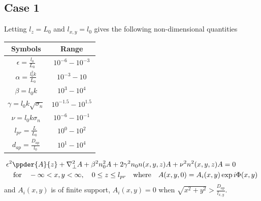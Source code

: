 \subsection{Case 1}
Letting $l_{z} = L_0$ and $l_{x,y} = l_0$ gives the following non-dimensional quantities 
\begin{center}
\begin{tabular}{ |c|c| }
\hline
\textbf{Symbols} & \textbf{Range}  \\
\hline
\hline
$\epsilon = \frac{l_{0}}{L_{0}}$        & $10^{-6}-10^{-3}$ \\
\hline
$\alpha = \frac{l_0^2 k }{L_0}$         & $10^{-3} - 10$ \\
\hline
$\beta = l_0 k$                         & $10^{3} - 10^{4}$ \\
\hline
$\gamma = l_0 k \sqrt{\sigma_n}$        & $10^{-1.5} - 10^{1.5}$ \\  
\hline
$\nu = l_0 k \sigma_n$                  & $10^{-6} - 10^{-1}$ \\ 
\hline
$l_{pr} = \frac{L}{L_0}$                & $10^{0} - 10^{2}$ \\ 
\hline
$d_{ap} = \frac{D_{ap}}{l_0}$           & $10^{1} - 10^{4}$ \\ 
\hline
\end{tabular}
\end{center}

\begin{equation}\label{EQ:helmholtz_equation_4}
\begin{split}
  & \epsilon^2 \ppder{A}{z} + \nabla_{\perp}^2 A + \beta^2 n_0^2 A +  2 \gamma^2 n_0 n(x,y,z) A + \nu^2 n^2(x,y,z) A = 0 \\
  &\quad  \mbox{for}  \quad -\infty < x,y < \infty, \quad 0 \leq z \leq l_{pr} \quad  
  \mbox{where} \quad A(x,y,0) = A_{i}(x,y)\exp{i \Phi(x,y)}
\end{split}
\end{equation}
and $A_{i}(x,y)$ is of finite support, \ie $A_{i}(x,y) = 0$ when $\sqrt{x^2 + y^2} > \frac{D_{ap}}{l_{x,y}}$.




